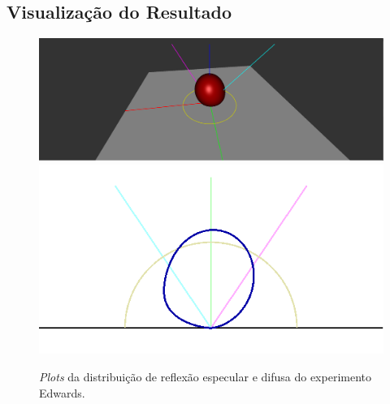 \subsection{Visualização do Resultado}
\begin{figure}[H]
    \caption{\small{\textit{Plots} da distribuição de reflexão especular e difusa do experimento Edwards.}}
    \label{fig-edwards-2006-plots}
    \vspace{42px}
  \includegraphics[width=\linewidth]{./Imagens/brdfs/edwards-2006-3D-plot}
\endminipage\hfill
{}
  \includegraphics[width=\linewidth]{./Imagens/brdfs/edwards-2006-polar-plot.png}
\endminipage\hfill
\end{figure}

